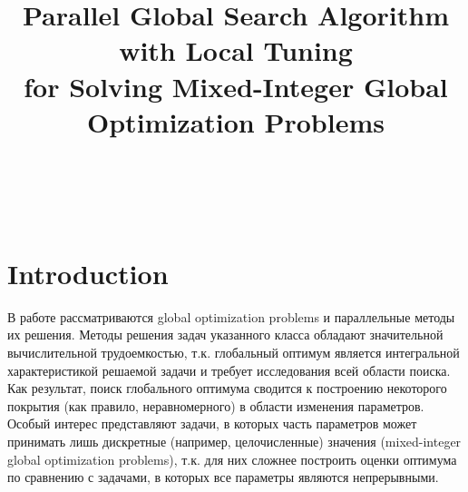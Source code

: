 \documentclass[
11pt,%
tightenlines,%
twoside,%
onecolumn,%
nofloats,%
nobibnotes,%
nofootinbib,%
superscriptaddress,%
noshowpacs,%
centertags]%
{revtex4}
\begin{document}

\title{Parallel Global Search Algorithm with Local Tuning\\ 
for Solving Mixed-Integer Global Optimization Problems}

\author{~}


\author{~}




\begin{abstract} %
\end{abstract}



\maketitle


\section{Introduction}

В работе рассматриваются global optimization problems и параллельные методы их решения. Методы решения задач указанного класса  обладают значительной вычислительной трудоемкостью, т.к. глобальный оптимум является интегральной характеристикой решаемой задачи и требует исследования всей области поиска. Как результат, поиск глобального оптимума сводится к построению некоторого покрытия (как правило, неравномерного) в области изменения параметров. Особый интерес представляют задачи, в которых часть параметров может принимать лишь дискретные (например, целочисленные) значения (mixed-integer global optimization problems), т.к. для них сложнее построить оценки оптимума по сравнению с задачами, в которых все параметры являются непрерывными.
\end{document}
